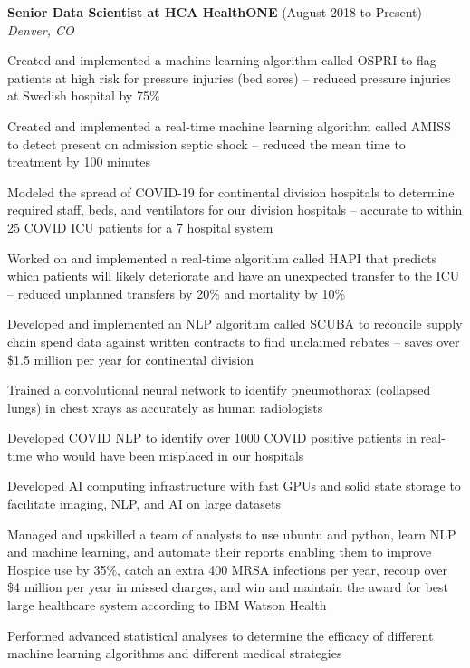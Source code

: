 \begin{resume}
    {\bf Senior Data Scientist at HCA HealthONE} (August 2018 to Present)\\\vspace{2mm}%
    \textit{Denver, CO}
    \begin{stuff}
        \vspace*{1mm}
            \item Created and implemented a machine learning algorithm called OSPRI to flag patients at high risk for pressure injuries (bed sores) -- reduced pressure injuries at Swedish hospital by 75\%
            \item Created and implemented a real-time machine learning algorithm called AMISS to detect present on admission septic shock -- reduced the mean time to treatment by 100 minutes
   \        \item Modeled the spread of COVID-19 for continental division hospitals to determine required staff, beds, and ventilators for our division hospitals -- accurate to within 25 COVID ICU patients for a 7 hospital system
            \item Worked on and implemented a real-time algorithm called HAPI that predicts which patients will likely deteriorate and have an unexpected transfer to the ICU -- reduced unplanned transfers by 20\% and mortality by 10\%
            \item Developed and implemented an NLP algorithm called SCUBA to reconcile supply chain spend data against written contracts to find unclaimed rebates -- saves over \$1.5 million per year for continental division
            \item Trained a convolutional neural network to identify pneumothorax (collapsed lungs) in chest xrays as accurately as human radiologists
            \item Developed COVID NLP to identify over 1000 COVID positive patients in real-time who would have been misplaced in our hospitals
            \item Developed AI computing infrastructure with fast GPUs and solid state storage to facilitate imaging, NLP, and AI on large datasets
            \item Managed and upskilled a team of analysts to use ubuntu and python, learn NLP and machine learning, and automate their reports enabling them to improve Hospice use by 35\%, catch an extra 400 MRSA infections per year, recoup over \$4 million per year in missed charges, and win and maintain the award for best large healthcare system according to IBM Watson Health
            \item Performed advanced statistical analyses to determine the efficacy of different machine learning algorithms and different medical strategies
    \end{stuff}


\end{resume}
